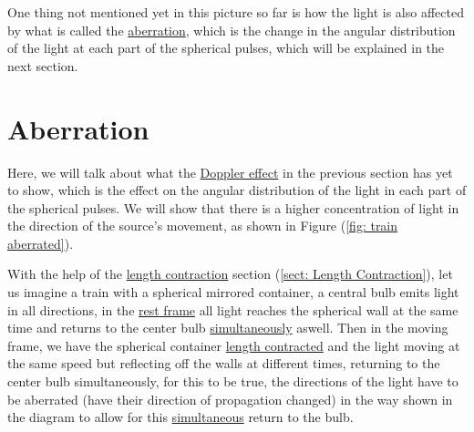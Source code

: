 One thing not mentioned yet in this picture so far is how the light is also affected by what is called the \hyperlink{def-aberration}{aberration}, which is the change in the angular distribution of the light at each part of the spherical pulses, which will be explained in the next section.

\section{Aberration}

Here, we will talk about what the \hyperlink{def-doppler-effect}{Doppler effect} in the previous section has yet to show, which is the effect on the angular distribution of the light in each part of the spherical pulses.
We will show that there is a higher concentration of light in the direction of the source's movement, as shown in Figure (\ref{fig: train aberrated}).

With the help of the \hyperlink{def-length-contraction}{length contraction} section (\ref{sect: Length Contraction}), let us imagine a train with a spherical mirrored container, a central bulb emits light in all directions, in the \hyperlink{def-proper-frame}{rest frame} all light reaches the spherical wall at the same time and returns to the center bulb \hyperlink{def-simultaneity}{simultaneously} aswell.
Then in the moving frame, we have the spherical container \hyperlink{def-length-contraction}{length contracted} and the light moving at the same speed but reflecting off the walls at different times, returning to the center bulb simultaneously, for this to be true, the directions of the light have to be aberrated (have their direction of propagation changed) in the way shown in the diagram to allow for this \hyperlink{def-simultaneity}{simultaneous} return to the bulb.

